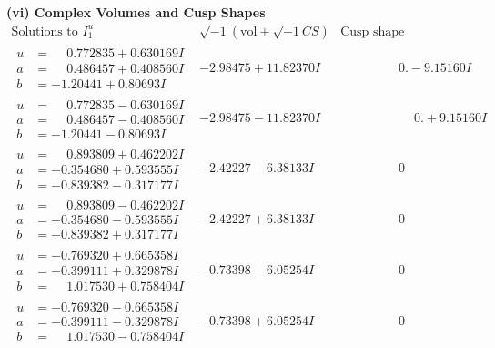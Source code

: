 \documentclass[1p]{elsarticle_modified}
\theoremstyle{definition}
\newcommand{\I}{\sqrt{-1}}
\begin{document}
\newpage\flushleft \textbf{(vi) Complex Volumes and Cusp Shapes}
$$\begin{array}{c|c|c}  
\text{Solutions to }I^u_{1}& \I (\text{vol} + \sqrt{-1}CS) & \text{Cusp shape}\\
 \hline 
\begin{aligned}
u &= \phantom{-}0.772835 + 0.630169 I \\
a &= \phantom{-}0.486457 + 0.408560 I \\
b &= -1.20441 + 0.80693 I\end{aligned}
 & -2.98475 + 11.82370 I & \phantom{-0.000000 } 0. - 9.15160 I \\ \hline\begin{aligned}
u &= \phantom{-}0.772835 - 0.630169 I \\
a &= \phantom{-}0.486457 - 0.408560 I \\
b &= -1.20441 - 0.80693 I\end{aligned}
 & -2.98475 - 11.82370 I & \phantom{-0.000000 -}0. + 9.15160 I \\ \hline\begin{aligned}
u &= \phantom{-}0.893809 + 0.462202 I \\
a &= -0.354680 + 0.593555 I \\
b &= -0.839382 - 0.317177 I\end{aligned}
 & -2.42227 - 6.38133 I & \phantom{-0.000000 } 0 \\ \hline\begin{aligned}
u &= \phantom{-}0.893809 - 0.462202 I \\
a &= -0.354680 - 0.593555 I \\
b &= -0.839382 + 0.317177 I\end{aligned}
 & -2.42227 + 6.38133 I & \phantom{-0.000000 } 0 \\ \hline\begin{aligned}
u &= -0.769320 + 0.665358 I \\
a &= -0.399111 + 0.329878 I \\
b &= \phantom{-}1.017530 + 0.758404 I\end{aligned}
 & -0.73398 - 6.05254 I & \phantom{-0.000000 } 0 \\ \hline\begin{aligned}
u &= -0.769320 - 0.665358 I \\
a &= -0.399111 - 0.329878 I \\
b &= \phantom{-}1.017530 - 0.758404 I\end{aligned}
 & -0.73398 + 6.05254 I & \phantom{-0.000000 } 0 \\ \hline\begin{aligned}

\end{aligned}
\end{array}$$
\end{document}
